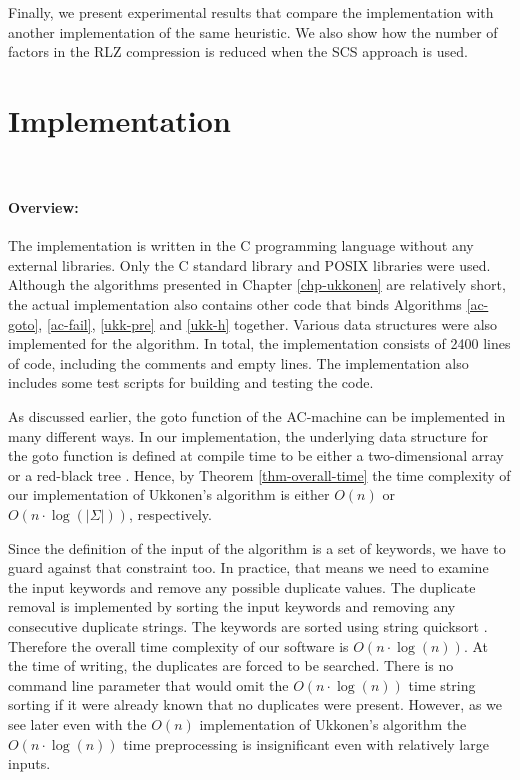 \documentclass[english,twoside,censored,csm,algorithms-track-2020]{HYthesisML}
\theoremstyle{plain}
\theoremstyle{definition}
\begin{document}
Finally, we present experimental results that compare the implementation with
another implementation of the same heuristic. We also show how the number of factors in the
RLZ compression is reduced when the SCS approach is used.

\section{Implementation}~\label{sec-our}
\paragraph{Overview:}
The implementation is written in the C programming language without any external
libraries. Only the C standard library and POSIX libraries were used.
Although the algorithms presented in Chapter
\ref{chp-ukkonen} are relatively short, the actual implementation also contains other code
that binds Algorithms \ref{ac-goto}, \ref{ac-fail}, \ref{ukk-pre} and \ref{ukk-h} together. 
Various data structures were also implemented for the algorithm. In total, the implementation consists
of 2400 lines of code, including the comments and empty lines. The implementation also includes some
test scripts for building and testing the code. 

As discussed earlier, the goto function of the AC-machine can be implemented in many different
ways. In our implementation, the underlying data structure for the goto function is defined at compile
time to be either a two-dimensional array or a red-black tree \citep{Cormen09}. Hence, by Theorem \ref{thm-overall-time}
the time complexity of our implementation of Ukkonen's algorithm is either $O(n)$ or
$O(n\cdot\log(|\Sigma|))$, respectively.

Since the definition of the input of the algorithm is a set of keywords, we have to guard against that
constraint too. In practice, that means we need to examine the input keywords and remove any possible
duplicate values. The duplicate removal is implemented by sorting the input keywords and removing any
consecutive duplicate strings. The keywords are sorted using string quicksort \citep{Bentley97}.
Therefore the overall time complexity of our software is $O(n\cdot\log(n))$. At the time of writing, the
duplicates are forced to be searched. There is no command line parameter that would omit the 
$O(n\cdot\log(n))$ time string sorting if it were already known that no duplicates were present.
However, as we see later even with the $O(n)$ implementation
of Ukkonen's algorithm the $O(n\cdot\log(n))$ time preprocessing is insignificant even with relatively
large inputs.
\end{document}
